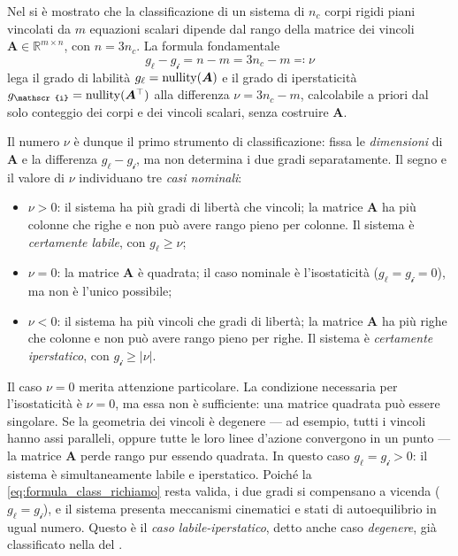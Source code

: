Nel  si è mostrato che la
classificazione di un sistema di $n_c$ corpi rigidi piani vincolati
da $m$ equazioni scalari dipende dal rango della matrice dei
vincoli $\bm{A} \in \mathbb{R}^{m \times n}$, con $n = 3n_c$.
La formula fondamentale
\begin{equation}\label{eq:formula_class_richiamo}
	g_\ell - g_{\mathscr{i}} = n - m = 3n_c - m \eqqcolon \nu
\end{equation}
lega il grado di labilità $g_\ell = \operatorname{nullity}(\bm{A})$ e il grado di
iperstaticità $g_{\mathscr{i}} = \nl(\bm{A}^\top)$ alla
differenza $\nu = 3n_c - m$, calcolabile a priori dal solo
conteggio dei corpi e dei vincoli scalari, senza costruire
$\bm{A}$.

Il numero $\nu$ è dunque il primo strumento di classificazione:
fissa le \emph{dimensioni} di $\bm{A}$ e la differenza
$g_\ell - g_{\mathscr{i}}$, ma non determina i due gradi
separatamente. Il segno e il valore di $\nu$ individuano tre
\emph{casi nominali}:

\begin{itemize}[nosep]
	\item $\nu > 0$: il sistema ha più gradi di libertà che
	vincoli; la matrice $\bm{A}$ ha più colonne che righe
	e non può avere rango pieno per colonne. Il sistema è
	\emph{certamente labile}, con $g_\ell \geq \nu$;
	
	\item $\nu = 0$: la matrice $\bm{A}$ è quadrata; il caso
	nominale è l'isostaticità ($g_\ell = g_{\mathscr{i}} = 0$),
	ma non è l'unico possibile;
	
	\item $\nu < 0$: il sistema ha più vincoli che gradi di
	libertà; la matrice $\bm{A}$ ha più righe che colonne e
	non può avere rango pieno per righe. Il sistema è
	\emph{certamente iperstatico}, con
	$g_{\mathscr{i}} \geq |\nu|$.
\end{itemize}

Il caso $\nu = 0$ merita attenzione particolare. La condizione
necessaria per l'isostaticità è $\nu = 0$, ma essa non è
sufficiente: una matrice quadrata può essere singolare. Se la
geometria dei vincoli è degenere --- ad esempio, tutti i vincoli
hanno assi paralleli, oppure tutte le loro linee d'azione
convergono in un punto --- la matrice $\bm{A}$ perde rango pur
essendo quadrata. In questo caso $g_\ell = g_{\mathscr{i}} > 0$:
il sistema è simultaneamente labile e iperstatico. Poiché la
\eqref{eq:formula_class_richiamo} resta valida, i due gradi si
compensano a vicenda ($g_\ell = g_{\mathscr{i}}$), e il sistema
presenta meccanismi cinematici e stati di autoequilibrio in ugual
numero. Questo è il \emph{caso labile-iperstatico}, detto anche
caso \emph{degenere}, già classificato nella
 del .

